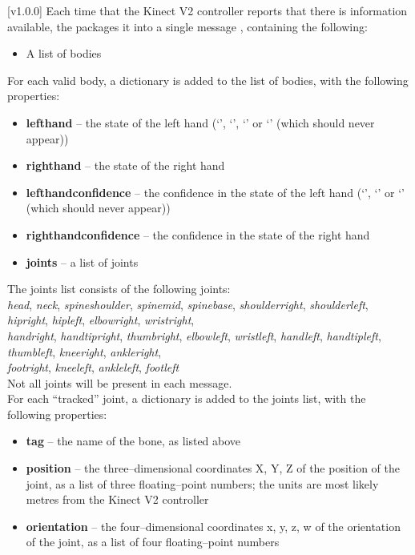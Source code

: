 [v1.0.0]
Each time that the Kinect V2 controller reports that there is information available,
the  packages it into a single message
\openSq{}\closeSq, containing the following:
\begin{itemize}
\item A list of bodies
\end{itemize}

For each valid body, a dictionary \openSq{}\closeSq{} is added to the list
of bodies, with the following properties:
\begin{itemize}
\item \textbf{lefthand} -- the state of the left hand (`', `',
`' or `' (which should never appear))
\item \textbf{righthand} -- the state of the right hand
\item \textbf{lefthandconfidence} -- the confidence in the state of the left hand
(`', `' or `' (which should never appear))
\item \textbf{righthandconfidence} -- the confidence in the state of the right hand
\item \textbf{joints} -- a list of joints
\end{itemize}

The joints list consists of the following joints:\\
\textbraceleft{} \emph{head}, \emph{neck}, \emph{spineshoulder}, \emph{spinemid},
\emph{spinebase}, \emph{shoulderright}, \emph{shoulderleft}, \emph{hipright},
\emph{hipleft}, \emph{elbowright}, \emph{wristright},\\
\emph{handright}, \emph{handtipright}, \emph{thumbright}, \emph{elbowleft},
\emph{wristleft}, \emph{handleft}, \emph{handtipleft}, \emph{thumbleft}, \emph{kneeright},
\emph{ankleright},\\
\emph{footright}, \emph{kneeleft}, \emph{ankleleft}, \emph{footleft} \textbraceright\\

Not all joints will be present in each message.\\

For each ``tracked'' joint, a dictionary is added to the joints list, with the following
properties:
\begin{itemize}
\item \textbf{tag} -- the name of the bone, as listed above
\item \textbf{position} -- the three--dimensional coordinates \openSq{}X, Y,
Z\closeSq{} of the position of the joint, as a list of three floating--point
numbers; the units are most likely metres from the Kinect V2 controller
\item \textbf{orientation} -- the four--dimensional coordinates \openSq{}x, y,
z, w\closeSq{} of the orientation of the joint, as a list of four floating--point
numbers
\end{itemize}
\primaryEnd{}
